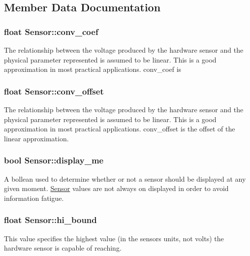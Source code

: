 \subsection{Member Data Documentation}
\subsubsection[{\texorpdfstring{conv\+\_\+coef}{conv_coef}}]{\setlength{\rightskip}{0pt plus 5cm}float Sensor\+::conv\+\_\+coef}\hypertarget{classSensor_a13a675b7eabac15861a4d9a723d3b5ae}{}\label{classSensor_a13a675b7eabac15861a4d9a723d3b5ae}
The relationship between the voltage produced by the hardware sensor and the physical parameter represented is assumed to be linear. This is a good approximation in most practical applications. conv\+\_\+coef is 
\subsubsection[{\texorpdfstring{conv\+\_\+offset}{conv_offset}}]{\setlength{\rightskip}{0pt plus 5cm}float Sensor\+::conv\+\_\+offset}\hypertarget{classSensor_a44d7755fab946e33ce35813b9057c910}{}\label{classSensor_a44d7755fab946e33ce35813b9057c910}
The relationship between the voltage produced by the hardware sensor and the physical parameter represented is assumed to be linear. This is a good approximation in most practical applications. conv\+\_\+offset is the offset of the linear approximation. 
\subsubsection[{\texorpdfstring{display\+\_\+me}{display_me}}]{\setlength{\rightskip}{0pt plus 5cm}bool Sensor\+::display\+\_\+me}\hypertarget{classSensor_ad9b7163e079befb8f3f9af6bdcc0ce21}{}\label{classSensor_ad9b7163e079befb8f3f9af6bdcc0ce21}
A bollean used to determine whether or not a sensor should be displayed at any given moment. \hyperlink{classSensor}{Sensor} values are not always on displayed in order to avoid information fatigue. 
\subsubsection[{\texorpdfstring{hi\+\_\+bound}{hi_bound}}]{\setlength{\rightskip}{0pt plus 5cm}float Sensor\+::hi\+\_\+bound}\hypertarget{classSensor_a74860a6d7345801931620a60df08eaab}{}\label{classSensor_a74860a6d7345801931620a60df08eaab}
This value specifies the highest value (in the sensor\textquotesingle{}s units, not volts) the hardware sensor is capable of reaching. 
